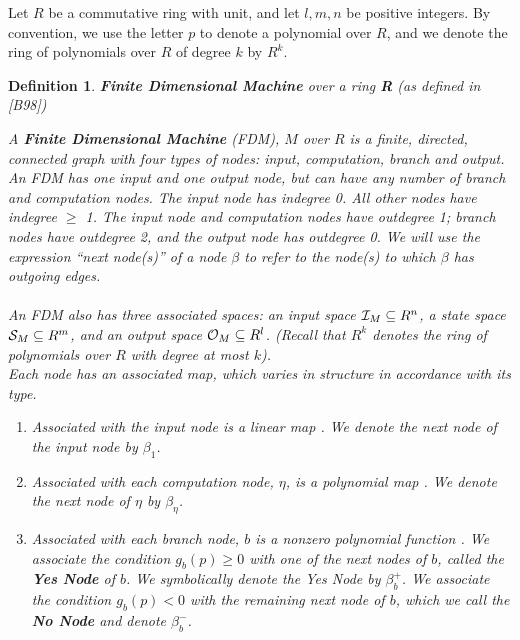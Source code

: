 \documentclass[twoside]{article}
\renewcommand{\cite}[1]{[#1]}
\newtheorem{definition}{Definition}[section]
\begin{document}
Let $R$ be a commutative ring with unit, and let $l, m, n$ be positive
integers.  By convention, we use the letter $p$ to denote a polynomial
over $R$, and we denote the ring of polynomials over $R$ of degree $k$
by $R^k$. 

\begin{definition}{\textbf{Finite Dimensional Machine} over a ring
    \textbf{R} (as defined in \cite{B98})}
  
  A \textbf{Finite Dimensional Machine} (FDM), $M$ over $R$ is a
  finite, directed, connected graph with four types of nodes:
  \emph{input, computation, branch} and \emph{output}.  An FDM has one
  input and one output node, but can have any number of branch and
  computation nodes. The input node has indegree 0.  All other nodes
  have indegree $\geq$ 1. The input node and computation nodes have
  outdegree 1; branch nodes have outdegree 2, and the output node has
  outdegree 0.  We will use the expression ``next node(s)'' of a node
  $\beta$ to refer to the node(s) to which $\beta$ has outgoing edges.\\
  
  \emph{}\\
  
  An FDM also has three associated spaces: an input space $\mathcal{I}_M
  \subseteq R^n$, a state space $\mathcal{S}_M \subseteq R^m$, and an
  output space $\mathcal{O}_M \subseteq R^l$.  (Recall that $R^k$
  denotes the ring of polynomials over $R$ with degree at most $k$).\\
  
  Each node has an associated map, which varies in structure in
  accordance with its type.
  \begin{enumerate}
  \item Associated with the input node is a linear map
    . We denote the next node
    of the input node by $\beta_1$.
    
  \item Associated with each computation node, $\eta$, is a polynomial
    map . We denote the
    next node of $\eta$ by $\beta_\eta$.
    
  \item Associated with each branch node, $b$ is a nonzero polynomial
    function .  We associate the
    condition $g_b(p) \geq 0$ with one of the next nodes of $b$,
    called the \textbf{Yes Node} of $b$.  We symbolically denote the
    Yes Node by $\beta_b^+$. We associate the condition $g_b(p) < 0$
    with the remaining next node of $b$, which we call the \textbf{No
      Node} and denote $\beta_b^-$.
    

\end{enumerate}
\end{definition}
\end{document}
